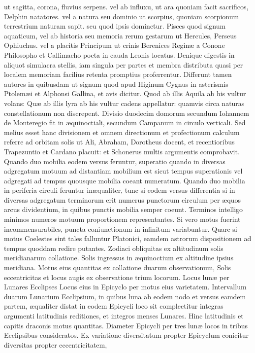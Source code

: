 \documentclass[11pt,a4paper]{article}
\begin{document}
ut sagitta, corona, fluvius serpens. vel ab influxu, ut ara quoniam facit sacrificos, Delphin natatores. vel a natura seu dominio ut scorpius, quoniam scorpionum terrestrium naturam sapit. seu quod ipsis dominetur. Pisces quod signum aquaticum, vel ab historia seu memoria rerum gestarum ut Hercules, Perseus Ophiuchus. vel a placitis Principum ut crinis Berenices Reginæ a Conone Philosopho et Callimacho poeta in cauda Leonis locatus. Denique digestis in aliquot simulacra stellis, iam singula per partes et membra distributa quasi per localem memoriam facilius retenta promptius proferrentur. Differunt tamen autores in quibusdam ut signum quod apud Higinum Cygnus in asterismis Ptolemæi et Alphonsi Gallina, et avis dicitur. Quod ab illis Aquila ab  his vultur volans: Quæ ab illis lyra ab his vultur cadens appellatur: quamvis circa naturas constellationum non discrepent.
Divisio duodecim domorum secundum Iohannem de Monteregio fit in æquinoctiali, secundum Campanum in circulo verticali. Sed melius esset hanc divisionem et omnem directionum et profectionum calculum referre ad orbitam solis ut Ali, Abraham, Dorotheus docent, et recentioribus Trapezuntio et Cardano placuit: et Schonerus multis argumentis comprobavit. Quando duo mobilia eodem versus feruntur, superatio quando in diversas adgregatum motuum ad distantiam mobilium est sicut tempus superationis vel adgregati ad tempus quousque mobilia coeant numeratum. Quando duo mobilia in periferia circuli feruntur inæqualiter, tunc si eodem versus differentia si in diversas adgregatum terminorum erit numerus punctorum circulum per æquos arcus dividentium, in quibus punctis mobilia semper coeunt. Terminos intelligo minimos numeros motuum proportionem representantes. Si vero motus fuerint incommensurabiles, puncta coniunctionum in infinitum variabuntur. Quare si motus Coelestes sint tales falluntur Platonici, eamdem astrorum dispositionem ad tempus quoddam redire putantes. Zodiaci obliquitas ex altitudinum solis meridianarum collatione. Solis ingressus in æquinoctium ex altitudine ipsius meridiana. Motus eius quantitas ex collatione duarum observationum, Solis eccentricitas et locus augis ex observatione trium locorum. Locus lunæ per Lunares Ecclipses Locus eius in Epicyclo per motus eius varietatem. Intervallum duarum Lunarium Ecclipsium, in quibus luna ab eodem nodo et versus eamdem partem, æqualiter distat in eodem Epicycli loco sit complectitur integras argumenti latitudinis reditiones, et integros menses Lunares. Hinc latitudinis et capitis draconis motus quantitas. Diameter Epicycli per tres lunæ locos in tribus Ecclipsibus consideratos. Ex variatione diversitatum propter Epicyclum conicitur diversitas propter eccentricitatem,
\end{document}
